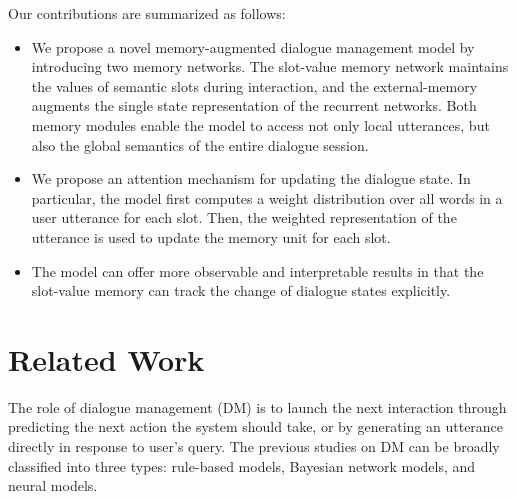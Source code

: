 

Our contributions are summarized as follows:
\begin{itemize}
    \item We propose a novel memory-augmented dialogue management model by introducing two memory networks. The slot-value memory network maintains the values of semantic slots during interaction, and the external-memory augments the single state representation of the recurrent networks. Both memory modules enable the model to access not only local utterances, but also the global semantics of the entire dialogue session. %
    
    \item We propose an attention mechanism for updating the dialogue state. In particular, the model first computes a weight distribution over all words in a user utterance for each slot. Then, the weighted representation of the utterance is used to update the memory unit for each slot.
    
    \item The model can offer more observable and interpretable results in that the slot-value memory can track the change of dialogue states explicitly.
    
\end{itemize}


\section{Related Work}
\label{sec:rel-work}

The role of dialogue management (DM) is to launch the next interaction through predicting the next action the system should take, or by generating an utterance directly in response to user's query. The previous studies on DM can be broadly classified into three types: rule-based models, Bayesian network models, and neural models.

